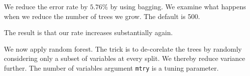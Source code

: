 \documentclass[]{article}
\newenvironment{Shaded}{\begin{snugshade}}{\end{snugshade}}
\newcommand{\CommentTok}[1]{\textcolor[rgb]{0.56,0.35,0.01}{\textit{#1}}}
\newcommand{\DataTypeTok}[1]{\textcolor[rgb]{0.13,0.29,0.53}{#1}}
\newcommand{\DecValTok}[1]{\textcolor[rgb]{0.00,0.00,0.81}{#1}}
\newcommand{\KeywordTok}[1]{\textcolor[rgb]{0.13,0.29,0.53}{\textbf{#1}}}
\newcommand{\NormalTok}[1]{#1}
\newcommand{\OperatorTok}[1]{\textcolor[rgb]{0.81,0.36,0.00}{\textbf{#1}}}
\newcommand{\OtherTok}[1]{\textcolor[rgb]{0.56,0.35,0.01}{#1}}
\newcommand{\StringTok}[1]{\textcolor[rgb]{0.31,0.60,0.02}{#1}}
\begin{document}
We reduce the error rate by \(5.76\%\) by using bagging. We examine what happens when we reduce the number of trees we grow. The default is 500.

\begin{Shaded}
\end{Shaded}

The result is that our rate increases substantially again.

We now apply random forest. The trick is to de-corelate the trees by randomly considering only a subset of variables at every split. We thereby reduce variance further. The number of variables argument \texttt{mtry} is a tuning parameter.
\end{document}
